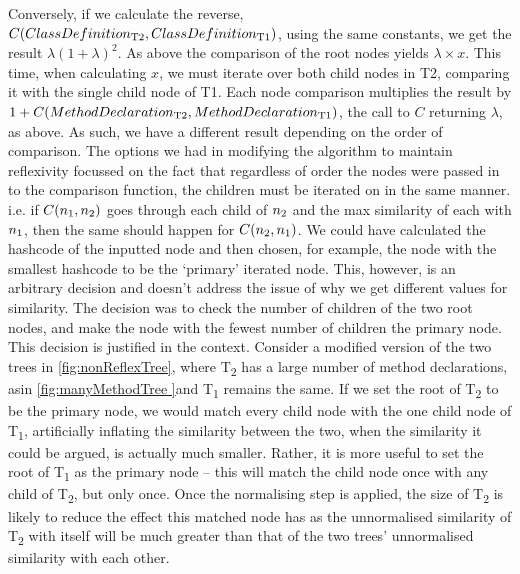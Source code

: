 Conversely, if we calculate the reverse, 
$C(ClassDefinition\textsubscript{T2}, ClassDefinition\textsubscript{T1})$, using the same constants, we get the result $\lambda(1+\lambda)^2$. As above the comparison of the root nodes yields $\lambda \times x$. This time, when calculating $x$, we must
iterate over both child nodes in T2, comparing it with the single child node of
T1. Each node comparison multiplies the result by $1+C(MethodDeclaration\textsubscript{T2},MethodDeclaration\textsubscript{T1})$, the call to $C$ returning $\lambda$, as above. As such, we have a different result depending on the order of comparison.
The options we had in modifying the algorithm to maintain reflexivity
focussed on the fact that regardless of order the nodes were passed in to the comparison function, the children must be iterated on in the same manner. 
i.e. if $C(n\textsubscript{1},n\textsubscript{2})$ goes through each child of $n\textsubscript{2}$ and the max similarity of each with $n\textsubscript{1}$, then the same should happen for
$C(n\textsubscript{2},n\textsubscript{1})$. We could have calculated the hashcode of the inputted node and then chosen, for example, the node with the smallest hashcode to be the `primary' iterated node. This, however, is an arbitrary decision and doesn’t address the issue of why we get different values for similarity. The decision was to check the number of children of the two root nodes, and make the node with the fewest number of children the primary node.
This decision is justified in the context. Consider a modified version of the two trees in 
\cref{fig:nonReflexTree}, where T\textsubscript{2} has a large number of method declarations, asin \cref{fig:manyMethodTree }and T\textsubscript{1} remains the same. If we set the
root of T\textsubscript{2} to be the primary node, we would match every child node with the one child node of T\textsubscript{1}, artificially inflating the similarity between the two, when the similarity it could be argued, is actually much smaller. Rather, it is more useful to set the root of T\textsubscript{1} as the primary node -- this will match the child node once with any child of T\textsubscript{2}, but only once. Once the normalising step is applied, the size of 
T\textsubscript{2} is likely to reduce the effect this matched node has as the unnormalised similarity of T\textsubscript{2} with itself will be much greater than that of the two trees’ unnormalised similarity with each other. 

